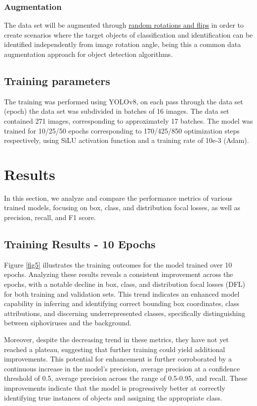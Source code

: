 \documentclass[runningheads]{llncs}
\begin{document}
\subsubsection{Augmentation}
The data set will be augmented through \href{https://blog.roboflow.com/why-and-how-to-implement-random-rotate-data-augmentation/}{random rotations and flips} in order to create scenarios where the target objects of classification and identification can be identified independently from image rotation angle, being this a common data augmentation approach for object detection algorithms. \cite{gonzalez2023} 

\subsection{Training parameters}
The training was performed using YOLOv8, on each pass through the data set (epoch) the data set was subdivided in batches of 16 images. The data set contained 271 images, corresponding to approximately 17 batches. The model was trained for 10/25/50 epochs corresponding to 170/425/850 optimization steps respectively, using SiLU activation function and a training rate of 10e-3 (Adam). 

\section{Results}

In this section, we analyze and compare the performance metrics of various trained models, focusing on box, class, and distribution focal losses, as well as precision, recall, and F1 score.

\subsection{Training Results - 10 Epochs}

Figure \ref{fig5} illustrates the training outcomes for the model trained over 10 epochs. Analyzing these results reveals a consistent improvement across the epochs, with a notable decline in box, class, and distribution focal losses (DFL) for both training and validation sets. This trend indicates an enhanced model capability in inferring and identifying correct bounding box coordinates, class attributions, and discerning underrepresented classes, specifically distinguishing between siphoviruses and the background.

Moreover, despite the decreasing trend in these metrics, they have not yet reached a plateau, suggesting that further training could yield additional improvements. This potential for enhancement is further corroborated by a continuous increase in the model's precision, average precision at a confidence threshold of 0.5, average precision across the range of 0.5-0.95, and recall. These improvements indicate that the model is progressively better at correctly identifying true instances of objects and assigning the appropriate class.
\end{document}
